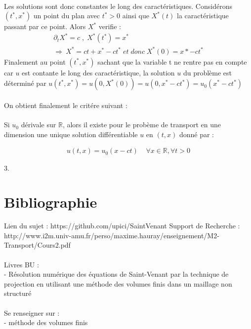 \documentclass[12pt]{article}
\begin{document}
\\
Les solutions sont donc constantes le long des caractéristiques. 
Considérons $(t^*,x^*)$ un point du plan avec $t^*>0$ ainsi que $X^*(t)$ la caractéristique passant par ce point. Alors $X^*$ verifie :
\begin{eqnarray}
        \partial_tX^*=c \;,\;  X^*(t^*)=x^*
        \\\Rightarrow\ X^*=ct+x^*-ct^*\; et\;donc\; X^*(0)=x*-ct^*
\end{eqnarray}
Finalement au point $(t^*,x^*)$ sachant que la variable t ne rentre pas en compte car $u$ est contante le long des caractéristique, la solution $u$ du problème est déterminé par $u(t^*,x^*)=u(0,X^*(0))=u(0,x^*-ct^*)=u_0(x^*-ct^*)$
\\
\\On obtient finalement le critére suivant :
\\
\\ Si $u_0$ dérivale sur $\mathbb{R}$, alors il existe pour le probème de transport en une dimension une unique solution différentiable $u$ en $(t,x)$  donné par :

\begin{eqnarray}
        u(t,x)=u_0(x-ct) \;\;\;\;\forall x\in \mathbb{R}, \forall t>0 
\end{eqnarray}

3.
\section{Bibliographie}

Lien du sujet : https://github.com/upici/SaintVenant
Support de Recherche : http://www.i2m.univ-amu.fr/perso/maxime.hauray/enseignement/M2-Transport/Cours2.pdf
\\
\\Livres BU :
\\- Résolution numérique des équations de Saint-Venant par la technique de projection en utilisant une méthode des volumes finis dans un maillage non structuré 
\\
\\Se renseigner sur :
\\- méthode des volumes finis
\end{document}
